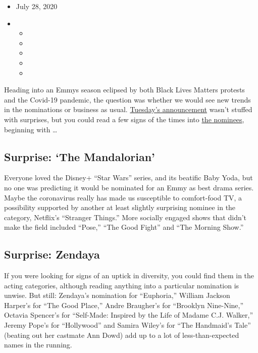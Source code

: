 \begin{itemize}
\item
  July 28, 2020
\item
  \begin{itemize}
  \item
  \item
  \item
  \item
  \item
  \end{itemize}
\end{itemize}

Heading into an Emmys season eclipsed by both Black Lives Matters
protests and the Covid-19 pandemic, the question was whether we would
see new trends in the nominations or business as usual.
\href{https://www.nytimes3xbfgragh.onion/2020/07/28/arts/television/emmy-nominations.html}{Tuesday's
announcement} wasn't stuffed with surprises, but you could read a few
signs of the times into
\href{https://www.nytimes3xbfgragh.onion/2020/07/28/arts/television/emmy-nominees-list.html}{the
nominees}, beginning with \ldots{}

\hypertarget{surprise-the-mandalorian}{%
\subsection{Surprise: `The
Mandalorian'}\label{surprise-the-mandalorian}}

Everyone loved the Disney+ ``Star Wars'' series, and its beatific Baby
Yoda, but no one was predicting it would be nominated for an Emmy as
best drama series. Maybe the coronavirus really has made us susceptible
to comfort-food TV, a possibility supported by another at least slightly
surprising nominee in the category, Netflix's ``Stranger Things.'' More
socially engaged shows that didn't make the field included ``Pose,''
``The Good Fight'' and ``The Morning Show.''

\hypertarget{surprise-zendaya}{%
\subsection{Surprise: Zendaya}\label{surprise-zendaya}}

If you were looking for signs of an uptick in diversity, you could find
them in the acting categories, although reading anything into a
particular nomination is unwise. But still: Zendaya's nomination for
``Euphoria,'' William Jackson Harper's for ``The Good Place,'' Andre
Braugher's for ``Brooklyn Nine-Nine,'' Octavia Spencer's for
``Self-Made: Inspired by the Life of Madame C.J. Walker,'' Jeremy Pope's
for ``Hollywood'' and Samira Wiley's for ``The Handmaid's Tale''
(beating out her castmate Ann Dowd) add up to a lot of
less-than-expected names in the running.

